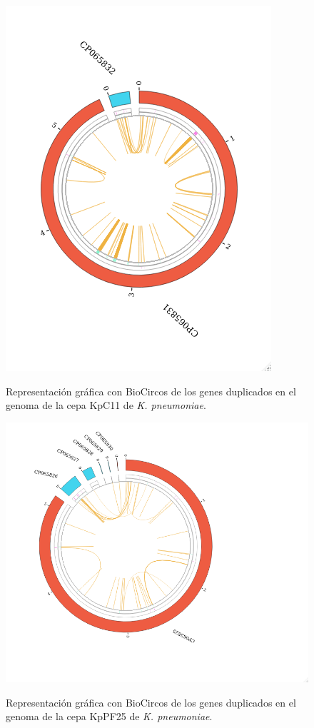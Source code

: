 \begin{figure}[h]
	\centering
	\captionsetup{width=\linewidth}
	\caption[Gráfica biocircos para la cepa KpC11 de \textit{K. pneumoniae}]{Representación gráfica con BioCircos de los genes duplicados en el genoma de la cepa KpC11 de \textit{K. pneumoniae}.}
	\includegraphics[width=0.8\linewidth]{figs/biocircos_KpC11.png}
	\label{fig:bioKpC11}
\end{figure}

\begin{figure}[h]
	\centering
	\captionsetup{width=\linewidth}
	\caption[Gráfica biocircos para la cepa KpPF25 de \textit{K. pneumoniae}]{Representación gráfica con BioCircos de los genes duplicados en el genoma de la cepa KpPF25 de \textit{K. pneumoniae}.}
	\includegraphics[width=0.8\linewidth]{figs/biocircos_KpPF25.png}
	\label{fig:bioKpPF25}
\end{figure}

